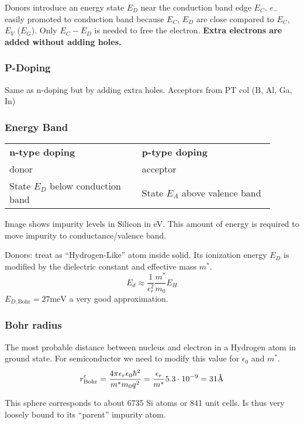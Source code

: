 \documentclass[a4paper, fontsize=8pt, landscape, DIV=1]{scrartcl}
\begin{document}
\begin{multicols*}{4}
  Donors introduce an energy state $E_D$ near the conduction band edge $E_C$. $e_-$ easily promoted to conduction band because $E_C$, $E_D$ are close compared to $E_C$, $E_V$ ($E_G$). Only $E_C-E_D$ is needed to free the electron. \textbf{Extra electrons are added without adding holes.}

  \subsubsection{P-Doping}
  Same as n-doping but by adding extra holes. Acceptors from PT col  (B, Al, Ga, In)

  \subsubsection{Energy Band}
    \begin{tabular}[h]{p{0.45\linewidth} | p{0.45\linewidth}}
    \textbf{n-type doping} & \textbf{p-type doping} \\
    donor & acceptor \\
    State $E_D$ below conduction band & State $E_A$ above valence band \\

  \end{tabular}

  Image shows impurity levels in Silicon in eV. This amount of energy is required to move impurity to conductance/valence band.

  Donors: treat as ``Hydrogen-Like'' atom inside solid. Its ionization energy $E_D$ is modified by the dielectric constant and effective mass $m^*$.
  \[E_d\approx \frac{1}{\epsilon_r^2}\frac{m^*}{m_0}E_H\]
  $E_{D,\text{Bohr}} = 27\text{meV}$ a very good approximation.

  \subsubsection{Bohr radius}
  The most probable distance between nucleus and electron in a Hydrogen atom in ground state. For semiconductor we need to modify this value for $\epsilon_0$ and $m^*$.
  \[r'_{\text{Bohr}}=\frac{4\pi\epsilon_r\epsilon_0\hbar^2}{m^*m_0q^2} = \frac{\epsilon_r}{m^*}5.3\cdot10^{-9}=31\textup{\AA}\]

  This sphere corresponds to about 6735  Si atoms or 841 unit cells. Is thus very loosely bound to its ``parent'' impurity atom.


\end{multicols*}
\end{document}
